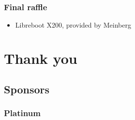 \documentclass[t]{beamer}
\begin{document}
\begin{frame}
	\frametitle{Final raffle}
	\begin{itemize}
		\item Libreboot X200, provided by Meinberg
	\end{itemize}
\end{frame}


\section{Thank you}

\subsection{Sponsors}

\begin{frame}
	\frametitle{Platinum}

\end{frame}
\end{document}
